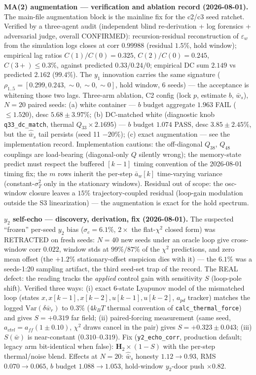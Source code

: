 \documentclass[11pt,a4paper,fontset=none]{ctexart}
\begin{document}
\textbf{MA(2) augmentation --- verification and ablation record
(2026-08-01).}  The main-file augmentation block is the mainline fix for
the c2/c3 seed ratchet.  Verified by a three-agent audit (independent
blind re-derivation + log forensics + adversarial judge, overall
CONFIRMED): recursion-residual reconstruction of $\varepsilon_w$ from
the simulation logs closes at corr $0.99988$ (residual $1.5\%$, hold
window); empirical lag ratios $C(1)/C(0) = 0.325$, $C(2)/C(0) = 0.245$,
$C(3{+}) \leq 0.3\%$, against predicted $0.33/0.24/0$; empirical DC sum
$2.149$ vs predicted $2.162$ ($99.4\%$).  The $y_1$ innovation carries
the same signature ($\rho_{1..5} = [0.299, 0.243, {\sim}0, {\sim}0,
{\sim}0]$, hold window, 6 seeds) --- the acceptance is whitening those
two lags.  Three-arm ablation, C2 config (lock $p$, estimate $b$,
$\bar{w}_s$), $N{=}20$ paired seeds: (a) white container --- $b$ budget
aggregate $1.963$ FAIL ($\leq 1.520$), desc $5.68\pm3.97\%$; (b)
DC-matched white (diagnostic knob \texttt{q33\_dc\_match}, thermal
$Q_{33} \times 2.1695$) --- $b$ budget $1.074$ PASS, desc
$3.85\pm2.45\%$, but the $\hat{\bar{w}}_s$ tail persists (seed 11
$-20\%$); (c) exact augmentation --- see the implementation record.
Implementation cautions: the off-diagonal $Q_{38}$, $Q_{48}$ couplings
are load-bearing (diagonal-only $Q$ silently wrong); the memory-state
predict must respect the buffered $[k{-}1]$ timing convention of the
2026-08-01 timing fix; the $m$ rows inherit the per-step $\bar{a}_w[k]$
time-varying variance (constant-$\sigma^2_T$ only in the stationary
windows).  Residual out of scope: the osc-window closure leaves a
$15\%$ trajectory-coupled residual (loop-gain modulation outside the S3
linearization) --- the augmentation is exact for the hold spectrum.

\textbf{$y_2$ self-echo --- discovery, derivation, fix (2026-08-01).}
The suspected ``frozen'' per-seed $y_2$ bias ($\sigma_c = 6.1\%$,
$2\times$ the flat-$\chi^2$ closed form) was RETRACTED on fresh seeds:
$N{=}40$ new seeds under an oracle loop give cross-window corr $0.022$,
window stds at $99\%/87\%$ of the $\chi^2$ predictions, and zero mean
offset (the $+1.2\%$ stationary-offset suspicion dies with it) --- the
$6.1\%$ was a seeds-1:20 sampling artifact, the third seed-set trap of
the record.  The REAL defect: the reading tracks the \emph{applied}
control gain with sensitivity $S$ (loop-pole shift).  Verified three
ways: (i) exact 6-state Lyapunov model of the mismatched loop (states
$x, x[k{-}1], x[k{-}2], u[k{-}1], u[k{-}2]$, $a_{pd}$ tracker) matches
the logged $\mathrm{Var}(\delta\bar{w}_r)$ to $0.3\%$ ($4k_BT$ thermal
convention of \texttt{calc\_thermal\_force}) and gives $S = +0.319$ far
field; (ii) paired-forcing measurement (same seed, $a_{ctrl} =
a_{ff}(1\pm0.10)$, $\chi^2$ draws cancel in the pair) gives
$S = +0.323 \pm 0.043$; (iii) $S(\bar{w})$ is near-constant
($0.310$--$0.319$).  Fix (\texttt{y2\_echo\_corr}, production default;
legacy arm bit-identical when false): $\mathbf{H}_2 \times (1-S)$ with
the per-step thermal/noise blend.  Effects at $N{=}20$:
$\hat{\bar{w}}_s$ honesty $1.12 \to 0.93$, RMS $0.070 \to 0.065$,
$b$ budget $1.088 \to 1.053$, hold-window $y_2$-door push
$\times 0.82$.
\end{document}

